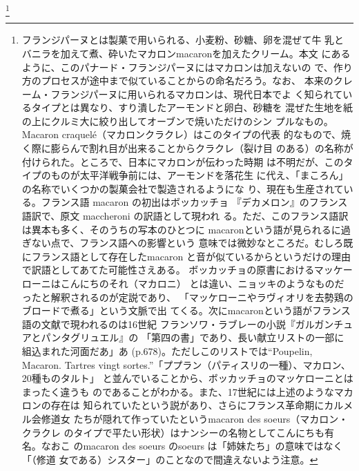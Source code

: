 \begin{recette}
\footnote{フランジパーヌとは製菓で用いられる、小麦粉、砂糖、卵を混ぜて牛
  乳とバニラを加えて煮、砕いたマカロンmacaronを加えたクリーム。本文
  にあるように、このパナード・フランジパーヌにはマカロンは加えないの
  で、作り方のプロセスが途中まで似ていることからの命名だろう。なお、
  本来のクレーム・フランジパーヌに用いられるマカロンは、現代日本でよ
  く知られているタイプとは異なり、すり潰したアーモンドと卵白、砂糖を
  混ぜた生地を紙の上にクルミ大に絞り出してオーブンで焼いただけのシン
  プルなもの。Macaron craquelé（マカロンクラクレ）はこのタイプの代表
  的なもので、焼く際に膨らんで割れ目が出来ることからクラクレ（裂け目
  のある）の名称が付けられた。ところで、日本にマカロンが伝わった時期
  は不明だが、このタイプのものが太平洋戦争前には、アーモンドを落花生
  に代え、「まころん」の名称でいくつかの製菓会社で製造されるようにな
  り、現在も生産されている。フランス語 macaron の初出はボッカッチョ
  『デカメロン』のフランス語訳で、原文 maccheroni の訳語として現われ
  る。ただ、このフランス語訳は異本も多く、そのうちの写本のひとつに
  macaronという語が見られるに過ぎない点で、フランス語への影響という
  意味では微妙なところだ。むしろ既にフランス語として存在したmacaron
  と音が似ているからというだけの理由で訳語としてあてた可能性さえある。
  ボッカッチョの原書におけるマッケーローニはこんにちのそれ（マカロニ）
  とは違い、ニョッキのようなものだったと解釈されるのが定説であり、
  「マッケローニやラヴィオリを去勢鶏のブロードで煮る」という文脈で出
  てくる。次にmacaronという語がフランス語の文献で現われるのは16世紀
  フランソワ・ラブレーの小説『ガルガンチュアとパンタグリュエル』の
  「第四の書」であり、長い献立リストの一部に組込まれた河面だあ」あ
  (p.678)。ただしこのリストでは``Poupelin, Macaron. Tartres vingt
  sortes.''「ププラン（パティスリの一種）、マカロン、20種ものタルト」
  と並んでいることから、ボッカッチョのマッケローニとはまったく違うも
  のであることがわかる。また、17世紀には上述のようなマカロンの存在は
  知られていたという説があり、さらにフランス革命期にカルメル会修道女
  たちが隠れて作っていたというmacaron des soeurs（マカロン・クラクレ
  のタイプで平たい形状）はナンシーの名物としてこんにちも有名。なおこ
  のmacaron des soeurs のsoeurs は「姉妹たち」の意味ではなく「（修道
  女である）シスター」のことなので間違えないよう注意。}



\end{recette}
